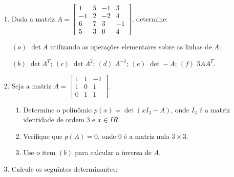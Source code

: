 \documentclass{report}
\newcommand{\real}{I\!\!R}               %
\begin{document}
\begin{Exercise}
\begin{enumerate}

\item \label{1lista31} Dada a matriz $A= \left[
\begin{array}{rrrr}
1 & 5 & -1 & 3 \\
-1 & 2 & -2 & 4 \\
6 & 7 & 3 & -1 \\
5 & 3 & 0 & 4
\end{array}
\right]$, determine:

$(a)$ $\det A$ utilizando as operações elementares sobre as linhas
de $A$;

$(b)$ $\det A^T$; \hspace{0.5cm} $(c)$ $\det A^2$; \hspace{0.5cm}
$(d)$ $A^{-1}$; \hspace{0.5cm} $(e)$ $\det -A$; \hspace{0.5cm}
$(f)$ $3AA^T$.


\item \label{1lista32} Seja a matriz $A=\left[
\begin{array}{rrr}
1 & 1 & -1 \\
1 & 0 & 1 \\
0 & 1 & 1
\end{array}
\right].$
\begin{enumerate}
    \item Determine o polinômio $p(x)=\det (xI_3 -A)$, onde $I_3$
    é a matriz identidade de ordem $3$ e $x \in \real$.
    \item Verifique que $p(A)=0$, onde $0$ é a matriz nula $3
    \times 3$.
    \item Use o item $(b)$ para calcular a inversa de $A$.
\end{enumerate}


\item \label{1lista33}  Calcule os seguintes determinantes:

\medskip


\end{enumerate}
\end{Exercise}
\end{document}
